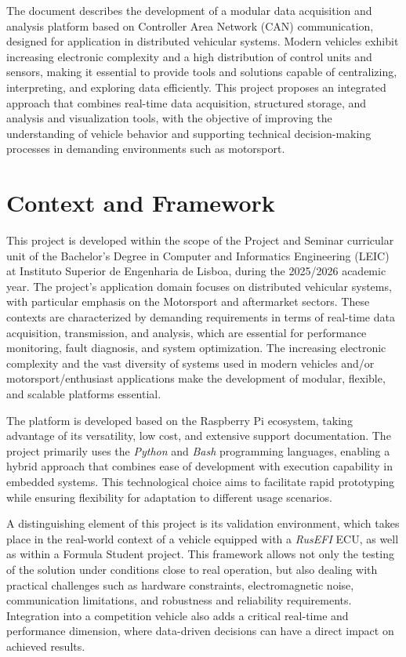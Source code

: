 
\hspace{5mm} The document describes the development of a modular data acquisition and analysis platform based on Controller Area Network (CAN) communication, designed for application in distributed vehicular systems. Modern vehicles exhibit increasing electronic complexity and a high distribution of control units and sensors, making it essential to provide tools and solutions capable of centralizing, interpreting, and exploring data efficiently. This project proposes an integrated approach that combines real-time data acquisition, structured storage, and analysis and visualization tools, with the objective of improving the understanding of vehicle behavior and supporting technical decision-making processes in demanding environments such as motorsport.


\section{Context and Framework}

This project is developed within the scope of the Project and Seminar curricular unit of the Bachelor's Degree in Computer and Informatics Engineering (LEIC) at Instituto Superior de Engenharia de Lisboa, during the 2025/2026 academic year. The project’s application domain focuses on distributed vehicular systems, with particular emphasis on the Motorsport and aftermarket sectors. These contexts are characterized by demanding requirements in terms of real-time data acquisition, transmission, and analysis, which are essential for performance monitoring, fault diagnosis, and system optimization. The increasing electronic complexity and the vast diversity of systems used in modern vehicles and/or motorsport/enthusiast applications make the development of modular, flexible, and scalable platforms essential.

The platform is developed based on the Raspberry Pi ecosystem, taking advantage of its versatility, low cost, and extensive support documentation. The project primarily uses the \textit{Python} and \textit{Bash} programming languages, enabling a hybrid approach that combines ease of development with execution capability in embedded systems. This technological choice aims to facilitate rapid prototyping while ensuring flexibility for adaptation to different usage scenarios.

A distinguishing element of this project is its validation environment, which takes place in the real-world context of a vehicle equipped with a \textit{RusEFI} ECU, as well as within a Formula Student project. This framework allows not only the testing of the solution under conditions close to real operation, but also dealing with practical challenges such as hardware constraints, electromagnetic noise, communication limitations, and robustness and reliability requirements. Integration into a competition vehicle also adds a critical real-time and performance dimension, where data-driven decisions can have a direct impact on achieved results.

